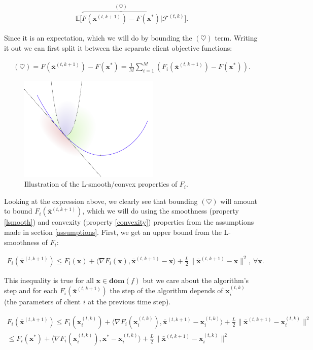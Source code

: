 \begin{align*}
    \mathbb{E} \Big[ \overbrace{F(\bar{\bm{x}}^{(t,k+1)}) - F(\bm{x}^*)}^{(\heartsuit)} | \mathcal{F}^{(t,k)}\Big].
\end{align*}

Since it is an expectation, which we will do by bounding the $(\heartsuit)$ term. Writing it out we can first split it between the separate client objective functions:

\begin{align*}
    (\heartsuit) = F(\bar{\bm{x}}^{(t,k+1)}) - F(\bm{x}^*) = \frac{1}{M} \sum_{i=1}^M \left( F_i(\bar{\bm{x}}^{(t,k+1)})  - F(\bm{x}^*)\right).
\end{align*}

\begin{figure}[h!]
    \centering
    \includegraphics[width=0.6\textwidth]{figures/smooth_convex.pdf}
    \caption{Illustration of the L-smooth/convex properties of $F_i$.}
\end{figure}

Looking at the expression above, we clearly see that bounding $(\heartsuit)$ will amount to bound $F_i(\bar{\bm{x}}^{(t,k+1)})$, which we will do using the smoothness (property \ref{lsmooth}) and convexity (property \ref{convexity}) properties from the assumptions made in section \ref{assumptions}. First, we get an upper bound from the L-smoothness of $F_i$:

\begin{align*}
    F_i(\bar{\bm{x}}^{(t,k+1)}) \leq  F_i(\bm{x}) +  \langle \nabla F_i(\bm{x}) ,\bar{\bm{x}}^{(t,k+1)}-\bm{x} \rangle +  \frac{L}{2} \|\bar{\bm{x}}^{(t,k+1)}-\bm{x} \|^2, ~ \forall \bm{x}.
\end{align*}

This inequality is true for all $\bm{x} \in \bm{dom}(f)$ but we care about the algorithm's step and for each $F_i(\bar{\bm{x}}^{(t,k+1)})$ the step of the algorithm depends of $\bm{x}_i^{(t,k)}$ (the parameters of client $i$ at the previous time step).

\begin{align*}
    F_i(\bar{\bm{x}}^{(t,k+1)}) \leq  F_i(\bm{x}_i^{(t,k)}) +  \langle \nabla F_i(\bm{x}_i^{(t,k)}) ,\bar{\bm{x}}^{(t,k+1)}-\bm{x}_i^{(t,k)} \rangle +  \frac{L}{2} \|\bar{\bm{x}}^{(t,k+1)}-\bm{x}_i^{(t,k)} \|^2 \\
    \leq  F_i(\bm{x}^{*}) +  \langle \nabla F_i(\bm{x}_i^{(t,k)}) ,\bm{x}^{*}-\bm{x}_i^{(t,k)} \rangle +  \frac{L}{2} \|\bar{\bm{x}}^{(t,k+1)}-\bm{x}_i^{(t,k)} \|^2
\end{align*}

